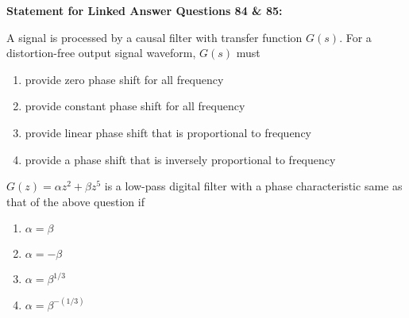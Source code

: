 \textbf{Statement for Linked Answer Questions 84 \& 85:}


\item [84.] A signal is processed by a causal filter with transfer function $G(s)$. For a distortion-free output signal waveform, $G(s)$ must
    \begin{enumerate}
        \item provide zero phase shift for all frequency
        \item provide constant phase shift for all frequency
        \item provide linear phase shift that is proportional to frequency
        \item provide a phase shift that is inversely proportional to frequency
    \end{enumerate}

    \item [85.] $G(z) = \alpha z^2 + \beta z^5$ is a low-pass digital filter with a phase characteristic same as that of the above question if
    \begin{enumerate}
        \item $\alpha = \beta$
        \item $\alpha = -\beta$
        \item $\alpha = \beta^{1/3}$
        \item $\alpha = \beta^{-(1/3)}$
    \end{enumerate}

    
